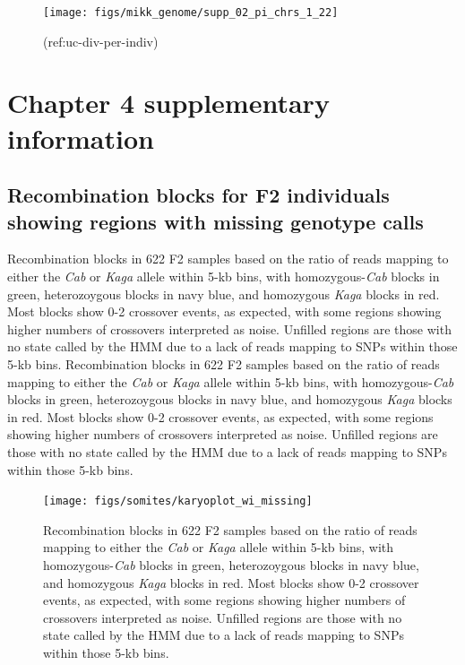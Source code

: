 \documentclass[
]{book}
\begin{document}
\begin{figure}
\texttt{[image: figs/mikk\_genome/supp\_02\_pi\_chrs\_1\_22]} \caption{(ref:uc-div-per-indiv)}\label{fig:nuc-div-per-indiv}
\end{figure}

\hypertarget{chapter-4-supplementary-information}{%
\chapter{Chapter 4 supplementary information}\label{chapter-4-supplementary-information}}

\hypertarget{recombination-blocks-for-f2-individuals-showing-regions-with-missing-genotype-calls}{%
\section{Recombination blocks for F2 individuals showing regions with missing genotype calls}\label{recombination-blocks-for-f2-individuals-showing-regions-with-missing-genotype-calls}}

Recombination blocks in 622 F2 samples based on the ratio of reads mapping to either the \emph{Cab} or \emph{Kaga} allele within 5-kb bins, with homozygous-\emph{Cab} blocks in green, heterozoygous blocks in navy blue, and homozygous \emph{Kaga} blocks in red. Most blocks show 0-2 crossover events, as expected, with some regions showing higher numbers of crossovers interpreted as noise. Unfilled regions are those with no state called by the HMM due to a lack of reads mapping to SNPs within those 5-kb bins. Recombination blocks in 622 F2 samples based on the ratio of reads mapping to either the \emph{Cab} or \emph{Kaga} allele within 5-kb bins, with homozygous-\emph{Cab} blocks in green, heterozoygous blocks in navy blue, and homozygous \emph{Kaga} blocks in red. Most blocks show 0-2 crossover events, as expected, with some regions showing higher numbers of crossovers interpreted as noise. Unfilled regions are those with no state called by the HMM due to a lack of reads mapping to SNPs within those 5-kb bins.

\begin{figure}
\texttt{[image: figs/somites/karyoplot\_wi\_missing]} \caption{Recombination blocks in 622 F2 samples based on the ratio of reads mapping to either the \emph{Cab} or \emph{Kaga} allele within 5-kb bins, with homozygous-\emph{Cab} blocks in green, heterozoygous blocks in navy blue, and homozygous \emph{Kaga} blocks in red. Most blocks show 0-2 crossover events, as expected, with some regions showing higher numbers of crossovers interpreted as noise. Unfilled regions are those with no state called by the HMM due to a lack of reads mapping to SNPs within those 5-kb bins.}\label{fig:karyo-wi-missing}
\end{figure}
\end{document}

